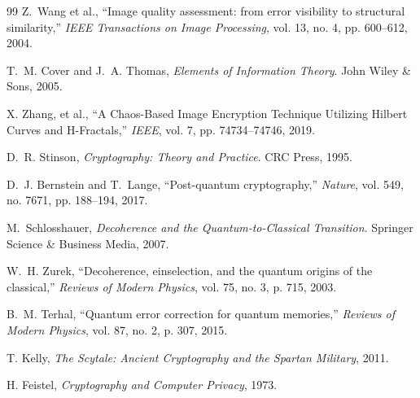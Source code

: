 \documentclass[12pt,fleqn]{article}
\begin{document}
\begin{thebibliography}{99}
Z.~Wang et al., ``Image quality assessment: from error visibility to structural similarity,'' \textit{IEEE Transactions on Image Processing}, vol. 13, no. 4, pp. 600--612, 2004.

T.~M. Cover and J.~A. Thomas, \textit{Elements of Information Theory}. John Wiley \& Sons, 2005.

X. Zhang, et al., ``A Chaos-Based Image Encryption Technique Utilizing Hilbert Curves and H-Fractals,'' \textit{IEEE}, vol. 7, pp. 74734--74746, 2019.

D.~R. Stinson, \textit{Cryptography: Theory and Practice}. CRC Press, 1995.

D.~J. Bernstein and T.~Lange, ``Post-quantum cryptography,'' \textit{Nature}, vol. 549, no. 7671, pp. 188--194, 2017.

M.~Schlosshauer, \textit{Decoherence and the Quantum-to-Classical Transition}. Springer Science \& Business Media, 2007.

W.~H. Zurek, ``Decoherence, einselection, and the quantum origins of the classical,'' \textit{Reviews of Modern Physics}, vol. 75, no. 3, p. 715, 2003.

B.~M. Terhal, ``Quantum error correction for quantum memories,'' \textit{Reviews of Modern Physics}, vol. 87, no. 2, p. 307, 2015.

T. Kelly, \textit{The Scytale: Ancient Cryptography and the Spartan Military}, 2011.

H. Feistel, \textit{Cryptography and Computer Privacy}, 1973.

\end{thebibliography}
\end{document}
